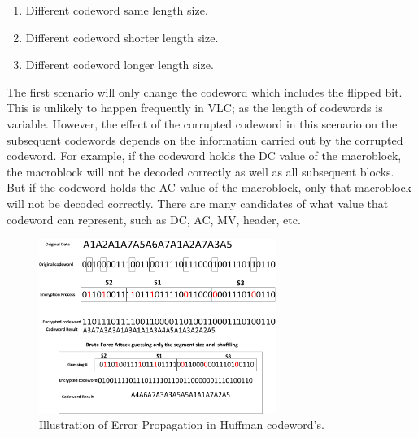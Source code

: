 \documentclass[preprint]{elsarticle}
\begin{document}
\begin{enumerate}
\item Different codeword same length size.
\item Different codeword shorter length size.
\item Different codeword longer length size.
\end{enumerate}

The first scenario will only change the codeword which includes the flipped bit. This is unlikely to happen frequently in VLC; as the length of codewords is variable. However, the effect of the corrupted codeword in this scenario on the subsequent codewords depends on the information carried out by the corrupted codeword. For example, if the codeword holds the DC value of the macroblock, the macroblock will not be decoded correctly as well as all subsequent blocks. But if the codeword holds the AC value of the macroblock, only that macroblock will not be decoded correctly. There are many candidates of what value that codeword can represent, such as DC, AC, MV, header, etc. 

\begin{figure}[!ht]
\centering
\includegraphics[width=7.7cm]{figure6.png}
\caption{Illustration of Error Propagation in Huffman codeword's.}
\label{f6}
\end{figure} 
\end{document}
